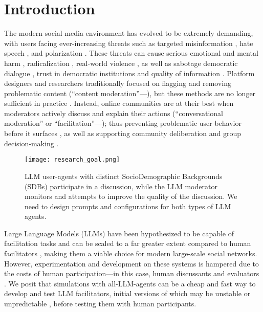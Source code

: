 %
\section{Introduction}
\label{sec:introduction}

The modern social media environment has evolved to be extremely demanding, with users facing ever-increasing threats such as targeted misinformation \cite{clemons2025disinformation, Denniss2025Social}, hate speech \cite{kolluri2025parler}, and polarization \cite{pranesh2024impactsocialmediapolarization}. These threats can cause serious emotional and mental harm \citep{proactive_moderation}, radicalization \citep{cho-etal-2024-language}, real-world violence \citep{schaffner_community_guidelines}, as well as sabotage democratic dialogue \citep{esau2017design, falk-etal-2021-predicting, seering_self_moderation}, trust in democratic institutions \citep{schroeder-etal-2024-fora} and quality of information \citep{make_reddit_great}. Platform designers and researchers traditionally focused on flagging and removing problematic content (``content moderation''---\citet{seering_self_moderation, cresci_pesonalized_interventions}), but these methods are no longer sufficient in practice \cite{horta_automated_moderation, schaffner_community_guidelines, small-polis-llm, korre2025evaluation}. Instead, online communities are at their best when moderators actively discuss and explain their actions (``conversational moderation'' or ``facilitation''---\citet{argyle2023, korre2025evaluation, falk-etal-2021-predicting}); thus preventing problematic user behavior before it surfaces \cite{cho-etal-2024-language, seering_self_moderation, cresci_pesonalized_interventions, make_reddit_great}, as well as supporting community deliberation and group decision-making \cite{kim_et_al_chatbot, seering_self_moderation}. 

\begin{figure}[t]
	\centering
	\texttt{[image: research\_goal.png]}
	\caption{LLM user-agents with distinct SocioDemographic Backgrounds (SDBs) participate in a discussion, while the LLM moderator monitors and attempts to improve the quality of the discussion. We need to design prompts and configurations for both types of LLM agents.}
	\label{fig::goals}
\end{figure}

Large Language Models (LLMs) have been hypothesized to be capable of facilitation tasks and can be scaled to a far greater extent compared to human facilitators \cite{korre2025evaluation, small-polis-llm}, making them a viable choice for modern large-scale social networks. However, experimentation and development on these systems is hampered due to the costs of human participation---in this case, human discussants and evaluators \citep{rossi_2024}. We posit that simulations with all-LLM-agents can be a cheap and fast way to develop and test LLM facilitators, initial versions of which may be unstable or unpredictable \cite{atil_2025, rossi_2024}, before testing them with human participants. 

